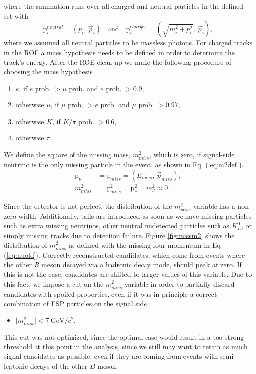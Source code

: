 \documentclass[oneside,a4paper,openany,12pt]{scrbook}
\newcommand {\e}[1]{\mathrm{~#1}}
\begin{document}
where the summation runs over all charged and neutral particles in the defined set with
\begin{equation}
\mathrm{p}^{neutral}_i = \left(p_i,\, \vec{p}_i \right) \quad \mathrm{and} \quad \mathrm{p}^{charged}_i = \left(\sqrt{m_i^2 + p_i^2},\, \vec{p}_i \right),
\label{eq:pcharged}
\end{equation}
where we assumed all neutral particles to be massless photons. For charged tracks in the ROE a mass hypothesis needs to be defined in order to determine the track's energy. After the ROE clean-up we make the following procedure of choosing the mass hypothesis
\begin{enumerate}
\item $e$, if $e$ prob. $> \mu$ prob. and $e$ prob. $> 0.9$,
\item otherwise $\mu$, if $\mu$ prob. $> e$ prob. and $\mu$ prob. $> 0.97$,
\item otherwise $K$, if $K/\pi$ prob. $> 0.6$,
\item otherwise $\pi$.
\end{enumerate} 
We define the square of the missing mass, $m_{miss}^2$, which is zero, if signal-side neutrino is the only missing particle in the event, as shown in Eq. (\ref{eq:m2def}).
\begin{align}
\label{eq:nuold}
\mathrm{p}_\nu &= \mathrm{p}_{miss} = \left(E_{miss},\,\vec{p}_{miss} \right),\\
\label{eq:m2def}
m_{miss}^2 &= \mathrm{p}_{miss}^2 = \mathrm{p}_{\nu}^2 = m_\nu^2 \approx 0.
\end{align}

Since the detector is not perfect, the distribution of the $m_{miss}^2$ variable has a non-zero width. Additionally, tails are introduced as soon as we have missing particles such as extra missing neutrinos, other neutral undetected particles such as $K_L^0$, or simply missing tracks due to detection failure. Figure \ref{fig:missm2} shows the distribution of $m_{miss}^2$ as defined with the missing four-momentum in Eq. (\ref{eq:nuold}). Correctly reconstructed candidates, which come from events where the other $B$ meson decayed via a hadronic decay mode, should peak at zero. If this is not the case, candidates are shifted to larger values of this variable. Due to this fact, we impose a cut on the $m_{miss}^2$ variable in order to partially discard candidates with spoiled properties, even if it was in principle a correct combination of FSP particles on the signal side
\begin{itemize}
\item $\vert m_{miss}^2 \vert < 7\e{GeV}/c^2$.
\end{itemize}
This cut was not optimized, since the optimal case would result in a too strong threshold at this point in the analysis, since we still may want to retain as much signal candidates as possible, even if they are coming from events with semi-leptonic decays of the other $B$ meson.
\end{document}
